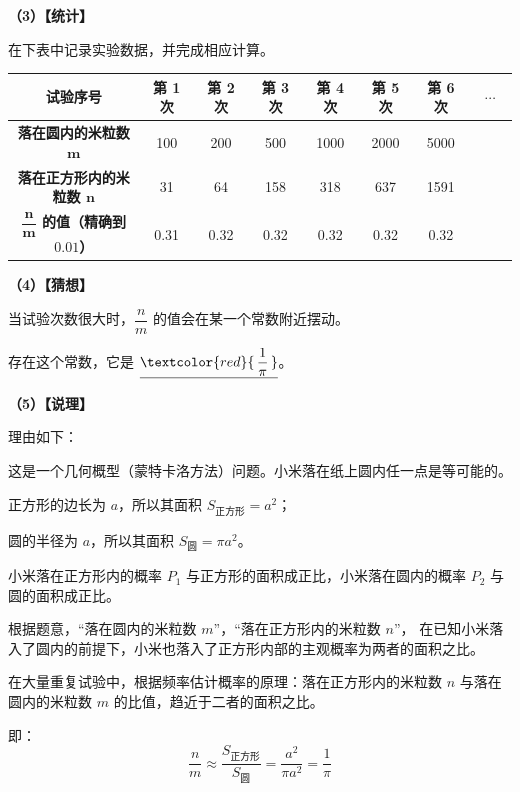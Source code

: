 \vspace{0.3cm}
\textbf{（3）【统计】}

在下表中记录实验数据，并完成相应计算。

\begin{center}
\renewcommand{\arraystretch}{1.6}
\begin{tabular}{|c|c|c|c|c|c|c|c|}
\hline
\cellcolor{gray!25} \textbf{试验序号} & 第 1 次 & 第 2 次 & 第 3 次 & 第 4 次 & 第 5 次 & 第 6 次 & $~~~\cdots~~~$ \\
\hline
\cellcolor{gray!25} \textbf{落在圆内的米粒数 $\boldsymbol{m}$} & 100 & 200 & 500 & 1000 & 2000 & 5000 & \\
\hline
\cellcolor{gray!25} \textbf{落在正方形内的米粒数 $\boldsymbol{n}$} & 31 & 64 & 158 & 318 & 637 & 1591 & \\
\hline
\cellcolor{gray!25} \textbf{$\dfrac{\boldsymbol{n}}{\boldsymbol{m}}$ 的值（精确到 $\boldsymbol{0.01}$）} & 0.31 & 0.32 & 0.32 & 0.32 & 0.32 & 0.32 & \\
\hline
\end{tabular}
\end{center}

\vspace{0.3cm}
\textbf{（4）【猜想】}

当试验次数很大时，$\dfrac{n}{m}$ 的值会在某一个常数附近摆动。

存在这个常数，它是 $\underline{\textcolor{red}{\,\dfrac{1}{\pi}\,}}$。

\vspace{0.3cm}
\textbf{（5）【说理】}

理由如下：

这是一个几何概型（蒙特卡洛方法）问题。小米落在纸上圆内任一点是等可能的。

正方形的边长为 $a$，所以其面积 $S_{\text{正方形}} = a^2$；

圆的半径为 $a$，所以其面积 $S_{\text{圆}} = \pi a^2$。

小米落在正方形内的概率 $P_1$ 与正方形的面积成正比，小米落在圆内的概率 $P_2$ 与圆的面积成正比。

根据题意，“落在圆内的米粒数 $m$”，“落在正方形内的米粒数 $n$”，
在已知小米落入了圆内的前提下，小米也落入了正方形内部的主观概率为两者的面积之比。

在大量重复试验中，根据频率估计概率的原理：落在正方形内的米粒数 $n$ 与落在圆内的米粒数 $m$ 的比值，趋近于二者的面积之比。

即：
$$\frac{n}{m} \approx \frac{S_{\text{正方形}}}{S_{\text{圆}}} = \frac{a^2}{\pi a^2} = \frac{1}{\pi}$$

